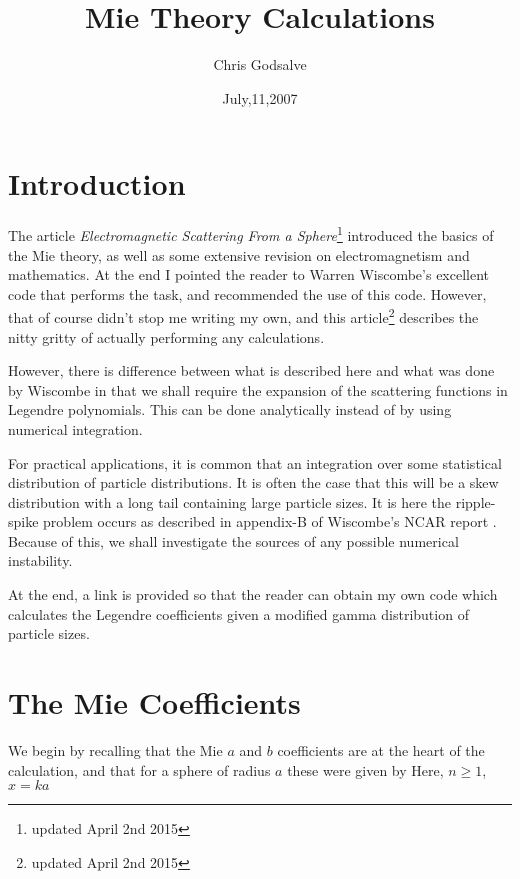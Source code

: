 \documentclass[12pt]{article}
\begin{document}
\thispagestyle{empty}

\title{Mie Theory Calculations}
\author{Chris Godsalve}
\date{July,11,2007}
\maketitle

\tableofcontents


\section{Introduction}

The article {\it Electromagnetic Scattering From a Sphere}\footnote{updated April 2nd 2015}
introduced the basics of the Mie theory, as well as some extensive revision on 
electromagnetism and mathematics. At the end I pointed the reader to Warren Wiscombe's 
excellent code that performs the task, and recommended the use of this code. 
However, that of course didn't stop me writing my own, and this article\footnote{updated April 2nd 2015} 
describes the nitty gritty of actually performing any calculations. 

However, there is difference between what is described here and what was 
done by Wiscombe in that we shall require the expansion of the scattering 
functions in Legendre polynomials. 
This can be done analytically  instead of by using numerical integration. 

For practical applications, it is common that an integration over some 
statistical distribution of particle distributions.
It is often the case that this will be a skew distribution with a long tail containing large
 particle sizes. It is here
the ripple-spike problem occurs as described in appendix-B of Wiscombe's NCAR 
report \cite{WisRep:Miebib}.
 Because of this, we shall investigate the sources of any possible numerical instability.

At the end, a link is provided so that the reader can obtain my own code which calculates the Legendre coefficients
given a modified gamma distribution of particle sizes.

\section{The Mie Coefficients}

We begin by recalling that the Mie $a$ and $b$ coefficients are at the heart of the calculation, and that for a sphere of radius $a$ these were given by
Here, $n \ge 1$, $x=ka$
\end{document}
